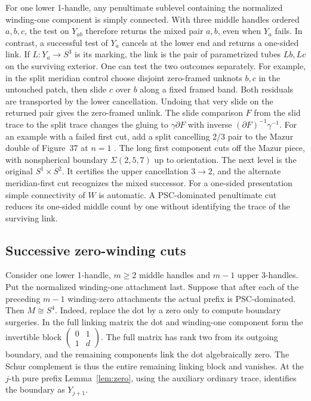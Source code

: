 \documentclass[11pt,letterpaper]{article}
\numberwithin{equation}{section}
\theoremstyle{remark}
\begin{document}
For one lower 1-handle, any penultimate sublevel containing the
normalized winding-one component is simply connected. With three
middle handles ordered \(a,b,c\), the test on \(Y_{ab}\) therefore
returns the mixed pair \(a,b\), even when \(Y_a\) fails. In contrast,
a successful test of \(Y_a\) cancels at the lower end and returns a
one-sided link. If \(L:Y_a\to S^3\) is its marking, the link is
the pair of parametrized tubes \(L b,L c\) on the surviving
exterior. One can test the two outcomes separately. For example,
in the split meridian control choose disjoint zero-framed unknots
\(b,c\) in the untouched patch, then slide \(c\) over \(b\)
along a fixed framed band. Both residuals are transported by the
lower cancellation. Undoing that very slide on the returned pair
gives the zero-framed unlink. The slide comparison \(F\) from
the slid trace to the split trace changes the gluing to
\(\gamma\partial F\) with inverse \((\partial F)^{-1}\gamma^{-1}\).
For an example with a failed first cut, add a split cancelling
2/3 pair to the Mazur double of Figure~37 at \(n=1\)
\cite{Isoshima2025MazurDoubles,AkbulutKirby1979Mazur}. The long
first component cuts off the Mazur piece, with nonspherical boundary
\(\Sigma(2,5,7)\) up to orientation. The next level is the original
\(S^1\times S^2\). It certifies the upper cancellation \(3\to2\),
and the alternate meridian-first cut recognizes the mixed successor.
For a one-sided presentation simple connectivity of \(W\) is automatic.
A PSC-dominated penultimate cut reduces its one-sided middle count by
one without identifying the trace of the surviving link.

\subsection{Successive zero-winding cuts}\label{sec:zero-sequence}
Consider one lower 1-handle, \(m\ge2\) middle handles and \(m-1\)
upper 3-handles. Put the normalized winding-one attachment last.
Suppose that after each of the preceding \(m-1\) winding-zero
attachments the actual prefix is PSC-dominated. Then \(M\cong S^4\).
Indeed, replace the dot by a zero only to compute boundary surgeries.
In the full linking matrix the dot and winding-one component form
the invertible block \(\left(\begin{smallmatrix}0&1\\1&d\end{smallmatrix}\right)\).
The full matrix has rank two from its outgoing boundary, and the
remaining components link the dot algebraically zero. The Schur
complement is thus the entire remaining linking block and vanishes.
At the \(j\)-th pure prefix Lemma~\ref{lem:zero}, using the auxiliary
ordinary trace, identifies the boundary as \(Y_{j+1}\).
\end{document}
